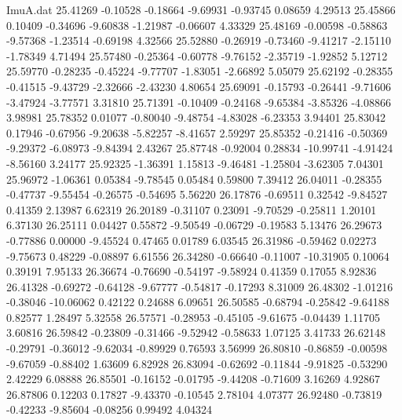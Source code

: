 \begin{filecontents}{ImuA.dat}
  25.41269   -0.10528   -0.18664   -9.69931   -0.93745    0.08659    4.29513
  25.45866    0.10409   -0.34696   -9.60838   -1.21987   -0.06607    4.33329
  25.48169   -0.00598   -0.58863   -9.57368   -1.23514   -0.69198    4.32566
  25.52880   -0.26919   -0.73460   -9.41217   -2.15110   -1.78349    4.71494
  25.57480   -0.25364   -0.60778   -9.76152   -2.35719   -1.92852    5.12712
  25.59770   -0.28235   -0.45224   -9.77707   -1.83051   -2.66892    5.05079
  25.62192   -0.28355   -0.41515   -9.43729   -2.32666   -2.43230    4.80654
  25.69091   -0.15793   -0.26441   -9.71606   -3.47924   -3.77571    3.31810
  25.71391   -0.10409   -0.24168   -9.65384   -3.85326   -4.08866    3.98981
  25.78352    0.01077   -0.80040   -9.48754   -4.83028   -6.23353    3.94401
  25.83042    0.17946   -0.67956   -9.20638   -5.82257   -8.41657    2.59297
  25.85352   -0.21416   -0.50369   -9.29372   -6.08973   -9.84394    2.43267
  25.87748   -0.92004    0.28834  -10.99741   -4.91424   -8.56160    3.24177
  25.92325   -1.36391    1.15813   -9.46481   -1.25804   -3.62305    7.04301
  25.96972   -1.06361    0.05384   -9.78545    0.05484    0.59800    7.39412
  26.04011   -0.28355   -0.47737   -9.55454   -0.26575   -0.54695    5.56220
  26.17876   -0.69511    0.32542   -9.84527    0.41359    2.13987    6.62319
  26.20189   -0.31107    0.23091   -9.70529   -0.25811    1.20101    6.37130
  26.25111    0.04427    0.55872   -9.50549   -0.06729   -0.19583    5.13476
  26.29673   -0.77886    0.00000   -9.45524    0.47465    0.01789    6.03545
  26.31986   -0.59462    0.02273   -9.75673    0.48229   -0.08897    6.61556
  26.34280   -0.66640   -0.11007  -10.31905    0.10064    0.39191    7.95133
  26.36674   -0.76690   -0.54197   -9.58924    0.41359    0.17055    8.92836
  26.41328   -0.69272   -0.64128   -9.67777   -0.54817   -0.17293    8.31009
  26.48302   -1.01216   -0.38046  -10.06062    0.42122    0.24688    6.09651
  26.50585   -0.68794   -0.25842   -9.64188    0.82577    1.28497    5.32558
  26.57571   -0.28953   -0.45105   -9.61675   -0.04439    1.11705    3.60816
  26.59842   -0.23809   -0.31466   -9.52942   -0.58633    1.07125    3.41733
  26.62148   -0.29791   -0.36012   -9.62034   -0.89929    0.76593    3.56999
  26.80810   -0.86859   -0.00598   -9.67059   -0.88402    1.63609    6.82928
  26.83094   -0.62692   -0.11844   -9.91825   -0.53290    2.42229    6.08888
  26.85501   -0.16152   -0.01795   -9.44208   -0.71609    3.16269    4.92867
  26.87806    0.12203    0.17827   -9.43370   -0.10545    2.78104    4.07377
  26.92480   -0.73819   -0.42233   -9.85604   -0.08256    0.99492    4.04324

\end{filecontents}
